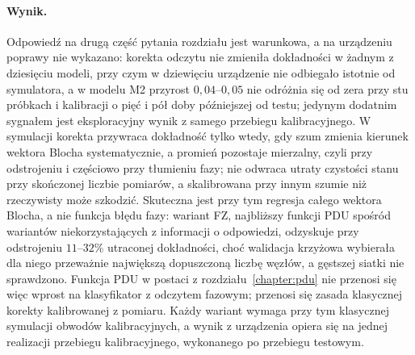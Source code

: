 \paragraph{Wynik.}
Odpowiedź na drugą część pytania rozdziału jest warunkowa, a na urządzeniu poprawy nie wykazano: korekta odczytu nie zmieniła dokładności w żadnym z dziesięciu modeli, przy czym w dziewięciu urządzenie nie odbiegało istotnie od symulatora, a w modelu M2 przyrost $0{,}04$--$0{,}05$ nie odróżnia się od zera przy stu próbkach i kalibracji o pięć i pół doby późniejszej od testu; jedynym dodatnim sygnałem jest eksploracyjny wynik z samego przebiegu kalibracyjnego.
W symulacji korekta przywraca dokładność tylko wtedy, gdy szum zmienia kierunek wektora Blocha systematycznie, a promień pozostaje mierzalny, czyli przy odstrojeniu i częściowo przy tłumieniu fazy; nie odwraca utraty czystości stanu przy skończonej liczbie pomiarów, a skalibrowana przy innym szumie niż rzeczywisty może szkodzić.
Skuteczna jest przy tym regresja całego wektora Blocha, a nie funkcja błędu fazy: wariant FZ, najbliższy funkcji PDU spośród wariantów niekorzystających z informacji o odpowiedzi, odzyskuje przy odstrojeniu $11$--$32\%$ utraconej dokładności, choć walidacja krzyżowa wybierała dla niego przeważnie największą dopuszczoną liczbę węzłów, a gęstszej siatki nie sprawdzono.
Funkcja PDU w postaci z rozdziału~\ref{chapter:pdu} nie przenosi się więc wprost na klasyfikator z odczytem fazowym; przenosi się zasada klasycznej korekty kalibrowanej z pomiaru.
Każdy wariant wymaga przy tym klasycznej symulacji obwodów kalibracyjnych, a wynik z urządzenia opiera się na jednej realizacji przebiegu kalibracyjnego, wykonanego po przebiegu testowym.


